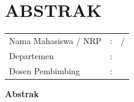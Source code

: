 \chapter*{ABSTRAK}
\begin{center}
	\large
	\textbf{\tatitle{}}
\end{center}

\vspace{2ex}

\begingroup
\setlength{\tabcolsep}{0pt}
\noindent
\bfseries
\begin{tabularx}{\textwidth}{l >{\centering}m{2em} X}
  Nama Mahasiswa / NRP		& : & \name{} / \nrp{}	\\

  Departemen 				& : & \department{}		\\

  Dosen Pembimbing       	& : & \advisor{}		\\
\end{tabularx}
\vspace{4ex}
\endgroup

\noindent
\textbf{Abstrak}


